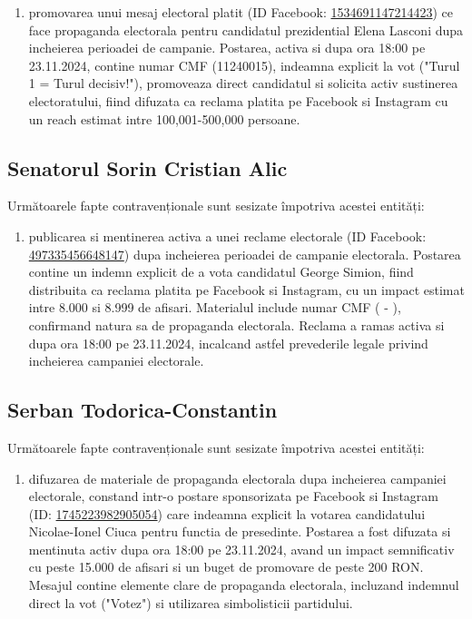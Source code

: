 \documentclass[a4paper,12pt]{article}
\begin{document}
\begin{enumerate}[leftmargin=*, label=\arabic*.)]
    \item promovarea unui mesaj electoral platit (ID Facebook: \href{https://www.facebook.com/ads/library/?id=1534691147214423}{1534691147214423}) ce face propaganda electorala pentru candidatul prezidential Elena Lasconi dupa incheierea perioadei de campanie. Postarea, activa si dupa ora 18:00 pe 23.11.2024, contine numar CMF (11240015), indeamna explicit la vot ("Turul 1 = Turul decisiv!"), promoveaza direct candidatul si solicita activ sustinerea electoratului, fiind difuzata ca reclama platita pe Facebook si Instagram cu un reach estimat intre 100,001-500,000 persoane.
\end{enumerate}

\vspace{0.5cm}

\subsection{Senatorul Sorin Cristian Alic}
Următoarele fapte contravenționale sunt sesizate împotriva acestei entități:

\begin{enumerate}[leftmargin=*, label=\arabic*.)]
    \item publicarea si mentinerea activa a unei reclame electorale (ID Facebook: \href{https://www.facebook.com/ads/library/?id=497335456648147}{497335456648147}) dupa incheierea perioadei de campanie electorala. Postarea contine un indemn explicit de a vota candidatul George Simion, fiind distribuita ca reclama platita pe Facebook si Instagram, cu un impact estimat intre 8.000 si 8.999 de afisari. Materialul include numar CMF ( - ), confirmand natura sa de propaganda electorala. Reclama a ramas activa si dupa ora 18:00 pe 23.11.2024, incalcand astfel prevederile legale privind incheierea campaniei electorale.
\end{enumerate}

\vspace{0.5cm}

\subsection{Serban Todorica-Constantin}
Următoarele fapte contravenționale sunt sesizate împotriva acestei entități:

\begin{enumerate}[leftmargin=*, label=\arabic*.)]
    \item difuzarea de materiale de propaganda electorala dupa incheierea campaniei electorale, constand intr-o postare sponsorizata pe Facebook si Instagram (ID: \href{https://www.facebook.com/ads/library/?id=1745223982905054}{1745223982905054}) care indeamna explicit la votarea candidatului Nicolae-Ionel Ciuca pentru functia de presedinte. Postarea a fost difuzata si mentinuta activ dupa ora 18:00 pe 23.11.2024, avand un impact semnificativ cu peste 15.000 de afisari si un buget de promovare de peste 200 RON. Mesajul contine elemente clare de propaganda electorala, incluzand indemnul direct la vot ("Votez") si utilizarea simbolisticii partidului.
\end{enumerate}
\end{document}
